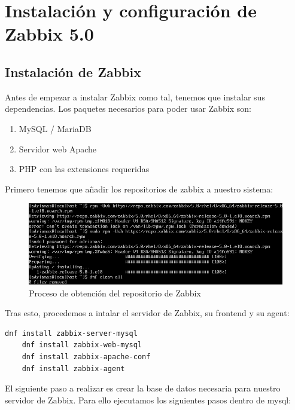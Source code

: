 \newpage
\section{Instalación y configuración de Zabbix 5.0}
\subsection{Instalación de Zabbix}

Antes de empezar a instalar Zabbix como tal, tenemos que instalar sus dependencias. Los paquetes necesarios para poder usar Zabbix son:

\begin{enumerate}
	\item MySQL / MariaDB
	\item Servidor web Apache
	\item PHP con las extensiones requeridas
\end{enumerate}

Primero tenemos que añadir los repositorios de zabbix a nuestro sistema:

\begin{figure}[H]
	\centering
	\includegraphics[scale=0.5]{graphics/img3}
	\caption{Proceso de obtención del repositorio de Zabbix}
\end{figure}

Tras esto, procedemos a intalar el servidor de Zabbix, su frontend y su agent:

\begin{lstlisting}[language=bash]
	dnf install zabbix-server-mysql
	dnf install zabbix-web-mysql 
	dnf install zabbix-apache-conf 
	dnf install zabbix-agent
\end{lstlisting}

El siguiente paso a realizar es crear la base de datos necesaria para nuestro servidor de Zabbix. Para ello ejecutamos los siguientes pasos dentro de mysql:

